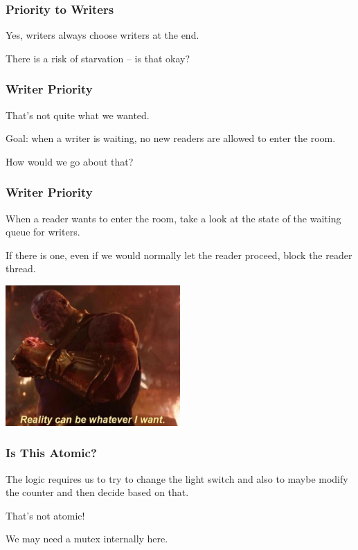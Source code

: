 \begin{frame}
\frametitle{Priority to Writers}

Yes, writers always choose writers at the end.

There is a risk of starvation -- is that okay?

\end{frame}

\begin{frame}
\frametitle{Writer Priority}

That's not quite what we wanted. 

Goal: when a writer is waiting, no new readers are allowed to enter the room. 

How would we go about that? 

\end{frame}

\begin{frame}
\frametitle{Writer Priority}

When a reader wants to enter the room, take a look at the state of the waiting queue for writers. 

If there is one, even if we would normally let the reader proceed, block the reader thread.

\begin{center}
	\includegraphics[width=0.5\textwidth]{images/ThanosReality.jpg}
\end{center}

\end{frame}

\begin{frame}
\frametitle{Is This Atomic?}

The logic requires us to try to change the light switch and also to maybe modify the counter and then decide based on that.

That's not atomic!

We may need a mutex internally here.

\end{frame}

